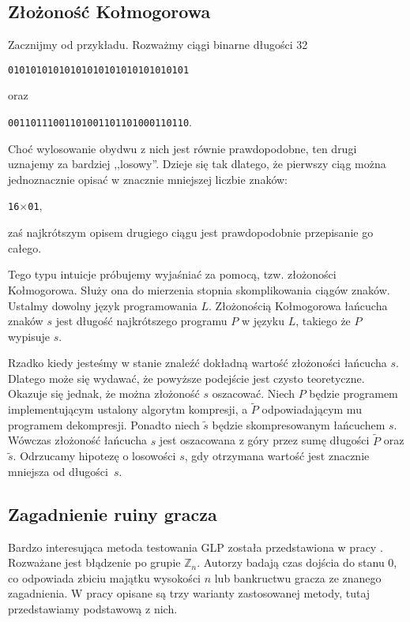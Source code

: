 \documentclass[a4paper,11pt,twoside]{book}
\theoremstyle{definition}
\newenvironment{nscenter}
 {\parskip=0pt\par\nopagebreak\centering}
 {\par\noindent\ignorespacesafterend}
\begin{document}
\subsection*{Złożoność Kołmogorowa}
Zacznijmy od przykładu. Rozważmy ciągi binarne długości 32
\begin{nscenter}
\texttt{01010101010101010101010101010101} 
\end{nscenter}
oraz
\begin{nscenter}
\texttt{00110111001101001101101000110110}. 
\end{nscenter}
Choć wylosowanie obydwu z nich jest równie prawdopodobne, ten drugi uznajemy za bardziej ,,losowy''. Dzieje się tak dlatego, że pierwszy ciąg można jednoznacznie opisać w znacznie mniejszej liczbie znaków:
\begin{nscenter}
\texttt{16$\times$01},
\end{nscenter}
zaś najkrótszym opisem drugiego ciągu jest prawdopodobnie przepisanie go całego.

Tego typu intuicje próbujemy wyjaśniać za pomocą, tzw. złożoności Kołmogorowa. Służy ona do mierzenia stopnia skomplikowania ciągów znaków. Ustalmy dowolny język programowania $L$. Złożonością Kołmogorowa łańcucha znaków $s$ jest długość najkrótszego programu $P$ w języku $L$, takiego że $P$ wypisuje $s$.

Rzadko kiedy jesteśmy w stanie znaleźć dokładną wartość złożoności łańcucha $s$. Dlatego może się wydawać, że powyższe podejście jest czysto teoretyczne. Okazuje się jednak, że można złożoność $s$ oszacować. Niech $P$ będzie programem implementującym ustalony algorytm kompresji, a $\tilde{P}$ odpowiadającym mu programem dekompresji. Ponadto niech $\tilde{s}$ będzie skompresowanym łańcuchem $s$. Wówczas złożoność łańcucha $s$ jest oszacowana z góry przez sumę długości $\tilde{P}$ oraz $\tilde{s}$. Odrzucamy hipotezę o losowości $s$, gdy otrzymana wartość jest znacznie mniejsza od długości~$s$.

\subsection*{Zagadnienie ruiny gracza}
Bardzo interesująca metoda testowania GLP została przedstawiona w pracy \cite{kim-choe}. Rozważane jest błądzenie po grupie $\mathbb{Z}_n$. Autorzy badają czas dojścia do stanu $0$, co odpowiada zbiciu majątku wysokości $n$ lub bankructwu gracza ze znanego zagadnienia. W pracy opisane są trzy warianty zastosowanej metody, tutaj przedstawiamy podstawową z nich.
\end{document}
